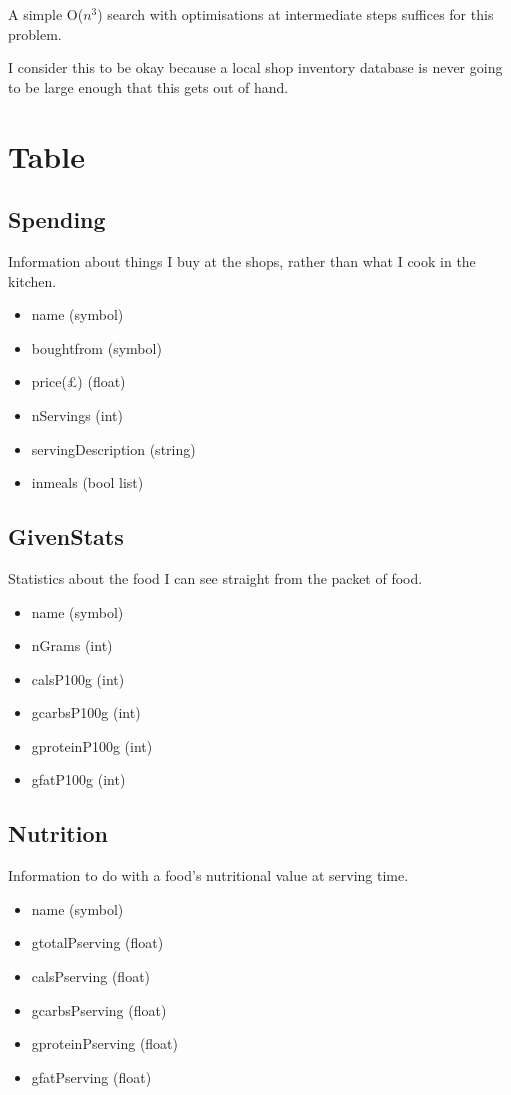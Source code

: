 \documentclass[a4paper]{article}
\begin{document}
A simple O($n^{3}$) search with optimisations at intermediate steps suffices 
for this problem.

I consider this to be okay because a local shop inventory database is 
never going to be large enough that this gets out of hand.

\section{Table}

\subsection{Spending}

Information about things I buy at the shops, rather than what I cook in the 
kitchen.

\begin{itemize}
  \item name (symbol)
  \item boughtfrom (symbol)
  \item price(£) (float)
  \item nServings (int)
  \item servingDescription (string)
  \item inmeals (bool list)
\end{itemize}

\subsection{GivenStats}

Statistics about the food I can see straight from the packet of food.

\begin{itemize}
  \item name (symbol)
  \item nGrams (int)
  \item calsP100g (int)
  \item gcarbsP100g (int)
  \item gproteinP100g (int)
  \item gfatP100g (int)
\end{itemize} 
  
\subsection{Nutrition}

Information to do with a food's nutritional value at serving time.

\begin{itemize}
  \item name (symbol)
  \item gtotalPserving (float)
  \item calsPserving (float)
  \item gcarbsPserving (float)
  \item gproteinPserving (float)
  \item gfatPserving (float)
\end{itemize}
\end{document}
